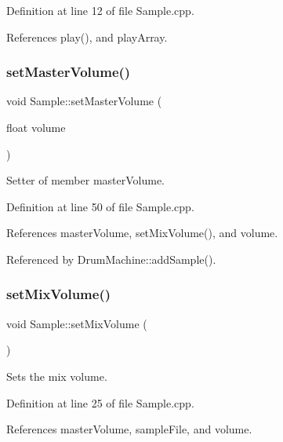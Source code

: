 Definition at line 12 of file Sample.\+cpp.



References play(), and play\+Array.

\mbox{\label{class_sample_af8ad49b65a536c535393e3968516b871}} 
\subsubsection{\texorpdfstring{set\+Master\+Volume()}{setMasterVolume()}}
{\footnotesize\ttfamily void Sample\+::set\+Master\+Volume (\begin{DoxyParamCaption}\item[{float}]{volume }\end{DoxyParamCaption})}



Setter of member master\+Volume. 



Definition at line 50 of file Sample.\+cpp.



References master\+Volume, set\+Mix\+Volume(), and volume.



Referenced by Drum\+Machine\+::add\+Sample().

\mbox{\label{class_sample_a6d13988721d2190947f65969d4737a48}} 
\subsubsection{\texorpdfstring{set\+Mix\+Volume()}{setMixVolume()}}
{\footnotesize\ttfamily void Sample\+::set\+Mix\+Volume (\begin{DoxyParamCaption}{ }\end{DoxyParamCaption})\hspace{0.3cm}{\ttfamily [private]}}



Sets the mix volume. 



Definition at line 25 of file Sample.\+cpp.



References master\+Volume, sample\+File, and volume.



